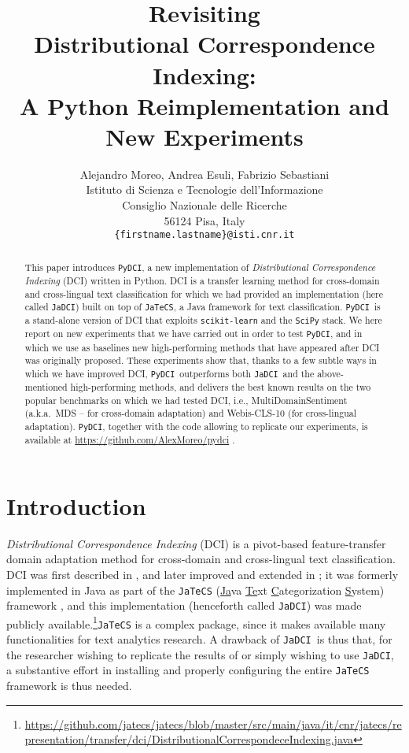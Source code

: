 \documentclass{article}
\title{Revisiting \\ Distributional Correspondence Indexing: \\ A Python Reimplementation and New Experiments}
\author{
  Alejandro Moreo, Andrea Esuli, Fabrizio Sebastiani \\
  Istituto di Scienza e Tecnologie dell'Informazione \\
  Consiglio Nazionale delle Ricerche \\
  56124 Pisa, Italy\\
  \texttt{\{firstname.lastname\}@isti.cnr.it} \\
}
\newcommand{\jadci}{\texttt{JaDCI}}
\newcommand{\pydci}{\texttt{PyDCI}}
\begin{document}
\maketitle

\begin{abstract}
  This paper introduces \pydci, a new implementation of
  \emph{Distributional Correspondence Indexing} (DCI) written in
  Python. DCI is a transfer learning method for cross-domain and
  cross-lingual text classification for which we had provided an
  implementation (here called \jadci) built on top of \texttt{JaTeCS},
  a Java framework for text classification. \pydci\ is a stand-alone
  version of DCI that exploits \texttt{scikit-learn} and the
  \texttt{SciPy} stack.
We here report on new experiments that we have carried out in order
  to test \pydci, and in which we use as baselines new high-performing
  methods that have appeared after DCI was originally proposed.  These
  experiments show that, thanks to a few subtle ways in which we have
  improved DCI, \pydci\ outperforms both \jadci\ and the
  above-mentioned high-performing methods, and delivers the best known
  results on the two popular benchmarks on which we had tested DCI,
  i.e., MultiDomainSentiment (a.k.a.\ MDS -- for cross-domain
  adaptation) and Webis-CLS-10 (for cross-lingual adaptation). \pydci,
  together with the code allowing to replicate our experiments, is
  available at \url{https://github.com/AlexMoreo/pydci} .
\end{abstract}





\section{Introduction}

\noindent \emph{Distributional Correspondence Indexing} (DCI) is a
pivot-based feature-transfer domain adaptation method for cross-domain
and cross-lingual text classification. DCI was first described in
\citep{dciecir2015}, and later improved and extended in
\citep{Moreo:2016fg}; it was formerly implemented in Java as part of
the \texttt{JaTeCS} (\underline{Ja}va \underline{Te}xt
\underline{C}ategorization \underline{S}ystem) framework
\citep{Esuli:2017wd}, and this implementation (henceforth called
\jadci) was made publicly
available.\footnote{\url{https://github.com/jatecs/jatecs/blob/master/src/main/java/it/cnr/jatecs/representation/transfer/dci/DistributionalCorrespondeceIndexing.java}}\texttt{JaTeCS}
is a complex package, since it makes available many functionalities
for text analytics research. A drawback of \jadci\ is thus that, for
the researcher wishing to replicate the results of
\citep{Moreo:2016fg} or simply wishing to use \jadci, a substantive
effort in installing and properly configuring the entire
\texttt{JaTeCS} framework is thus needed.
\end{document}
